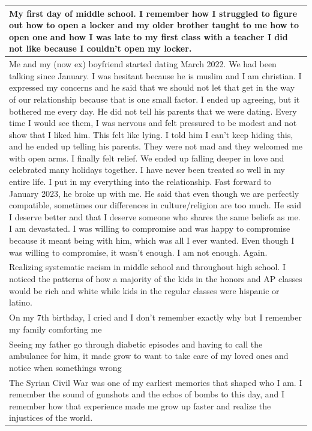 \documentclass[
  .7em,
  letterpaper,
  DIV=11,
  numbers=noendperiod]{scrartcl}
\begin{document}
\begin{table}
\begin{tabular}{l}
\hline
My first day of middle school. I remember how I struggled to figure out how to open a locker and my older brother taught to me how to open one and how I was late to my first class with a teacher I did not like because I couldn't open my locker.\\
\hline
Me and my (now ex) boyfriend started dating March 2022. We had been talking since January. I was hesitant because he is muslim and I am christian. I expressed my concerns and he said that we should not let that get in the way of our relationship because that is one small factor. I ended up agreeing, but it bothered me every day. He did not tell his parents that we were dating. Every time I would see them, I was nervous and felt pressured to be modest and not show that I liked him. This felt like lying. I told him I can't keep hiding this, and he ended up telling his parents. They were not mad and they welcomed me with open arms. I finally felt relief. We ended up falling deeper in love and celebrated many holidays together. I have never been treated so well in my entire life. I put in my everything into the relationship. Fast forward to January 2023, he broke up with me. He said that even though we are perfectly compatible, sometimes our differences in culture/religion are too much. He said I deserve better and that I deserve someone who shares the same beliefs as me. I am devastated. I was willing to compromise and was happy to compromise because it meant being with him, which was all I ever wanted. Even though I was willing to compromise, it wasn't enough. I am not enough. Again.\\
\hline
Realizing systematic racism in middle school and throughout high school. I noticed the patterns of how a majority of the kids in the honors and AP classes would be rich and white while kids in the regular classes were hispanic or latino.\\
\hline
On my 7th birthday, I cried and I don't remember exactly why but I remember my family comforting me\\
\hline
Seeing my father go through diabetic episodes and having to call the ambulance for him, it made grow to want to take care of my loved ones and notice when somethings wrong\\
\hline
The Syrian Civil War was one of my earliest memories that shaped who I am. I remember the sound of gunshots and the echos of bombs to this day, and I remember how that experience made me grow up faster and realize the injustices of the world.\\
\hline

\end{tabular}
\end{table}
\end{document}
